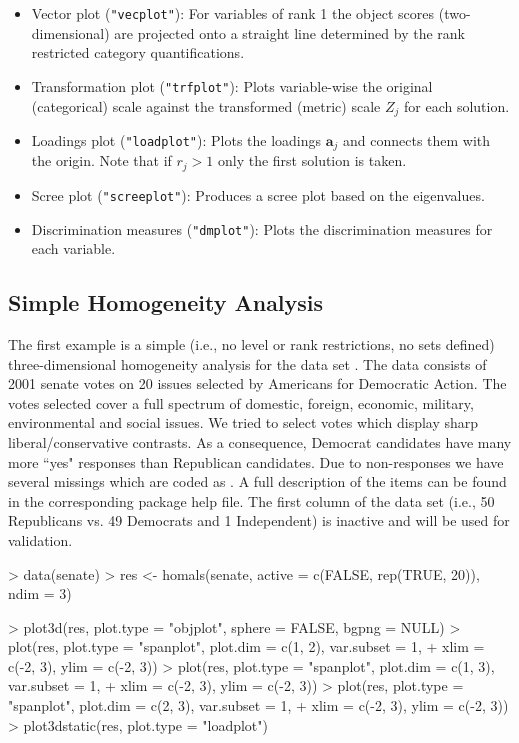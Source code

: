 \documentclass[article]{jss1}
\begin{document}
\begin{itemize}
\item Vector plot (\texttt{"vecplot"}): For variables of rank 1 the object scores (two-dimensional) are projected onto a straight line determined by the rank restricted category quantifications.
\item Transformation plot (\texttt{"trfplot"}): Plots variable-wise the original (categorical) scale against the transformed (metric) scale $Z_j$ for each solution.
\item Loadings plot (\texttt{"loadplot"}): Plots the loadings $\mathbf{a}_j$ and connects them with the origin. Note that if $r_j > 1$ only the first solution is taken.
\item Scree plot (\texttt{"screeplot"}): Produces a scree plot based on the eigenvalues. 
\item Discrimination measures (\texttt{"dmplot"}): Plots the discrimination measures for each variable. 
\end{itemize} 


\subsection{Simple Homogeneity Analysis}
\label{sec:sha}
The first example is a simple (i.e., no level or rank restrictions, no sets defined) three-dimensional homogeneity analysis for the  data set \citep{Ada:02}. The data consists of 2001 senate votes on 20 issues selected by Americans for Democratic Action. The votes selected cover a full spectrum of domestic, foreign, economic, military, environmental and social issues. We tried to select votes which display sharp liberal/conservative contrasts. As a consequence, Democrat candidates have many more ``yes" responses than Republican candidates. Due to non-responses we have several missings which are coded as . A full description of the items can be found in the corresponding package help file. The first column of the data set (i.e., 50 Republicans vs. 49 Democrats and 1 Independent) is inactive and will be used for validation. 

\begin{Schunk}
\begin{Sinput}
> data(senate)
> res <- homals(senate, active = c(FALSE, rep(TRUE, 20)), ndim = 3)
\end{Sinput}
\end{Schunk}
\begin{Schunk}
\begin{Sinput}
> plot3d(res, plot.type = "objplot", sphere = FALSE, bgpng = NULL)
> plot(res, plot.type = "spanplot", plot.dim = c(1, 2), var.subset = 1,
+ xlim = c(-2, 3), ylim = c(-2, 3))
> plot(res, plot.type = "spanplot", plot.dim = c(1, 3), var.subset = 1,
+ xlim = c(-2, 3), ylim = c(-2, 3))
> plot(res, plot.type = "spanplot", plot.dim = c(2, 3), var.subset = 1,
+ xlim = c(-2, 3), ylim = c(-2, 3))
> plot3dstatic(res, plot.type = "loadplot")
\end{Sinput}
\end{Schunk}
\end{document}
